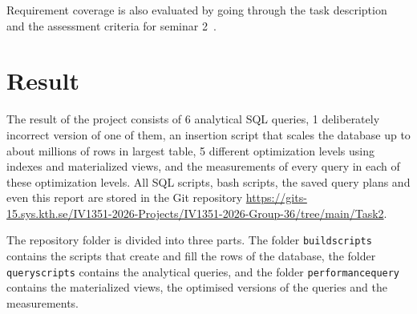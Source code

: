 \documentclass[a4paper]{scrartcl}
\renewcommand{\_}{\textunderscore\allowbreak}
\begin{document}
Requirement coverage is also evaluated by going through the task description~\cite{task2} and the assessment criteria for seminar 2~\cite{criteria2}.


\section{Result}
\label{sec:result}

The result of the project consists of 6 analytical SQL queries, 1 deliberately incorrect version of one of them, an insertion script that scales the database up to about millions of rows in largest table, 5 different optimization levels using indexes and materialized views, and the measurements of every query in each of these optimization levels. All SQL scripts, bash scripts, the saved query plans and even this report are stored in the Git repository \url{https://gits-15.sys.kth.se/IV1351-2026-Projects/IV1351-2026-Group-36/tree/main/Task2}.

The repository folder is divided into three parts. The folder \texttt{build\_scripts} contains the scripts that create and fill the rows of the database, the folder \texttt{query\_scripts} contains the analytical queries, and the folder \texttt{performance\_query} contains the materialized views, the optimised versions of the queries and the measurements.


\end{document}
